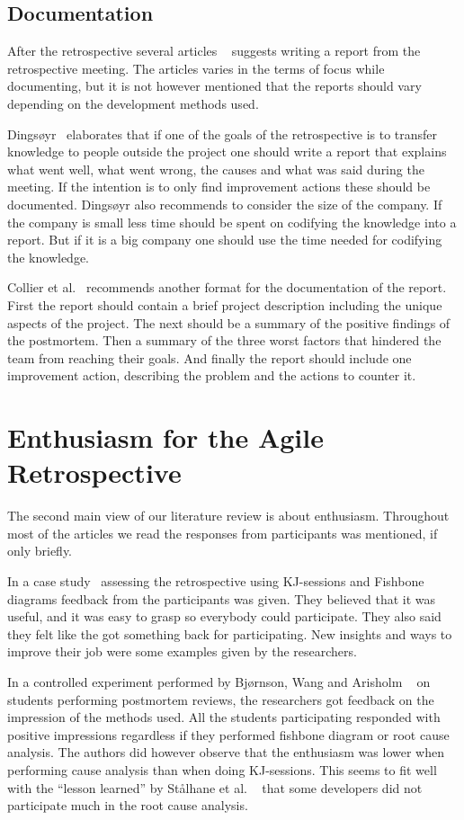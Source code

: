 \documentclass[12pt]{article}
\begin{document}
\subsection{Documentation}
After the retrospective several articles ~\cite{Dingsoyr2005, Moe2001, Hanssen2003, Collier1996} suggests writing a report from the retrospective meeting. The articles varies in the terms of focus while documenting, but it is not however mentioned that the reports should vary depending on the development methods used. 

Dingsøyr~\cite{Dingsoyr2005} elaborates that if one of the goals of the retrospective is to transfer knowledge to people outside the project one should write a report that explains what went well, what went wrong, the causes and what was said during the meeting. If the intention is to only find improvement actions these should be documented. Dingsøyr also recommends to consider the size of the company. If the company is small less time should be spent on codifying the knowledge into a report. But if it is a big company one should use the time needed for codifying the knowledge.

Collier et al.~\cite{Collier1996} recommends another format for the documentation of the report. First the report should contain a brief project description including the unique aspects of the project. The next should be a summary of the positive findings of the postmortem. Then a summary of the three worst factors that hindered the team from reaching their goals. And finally the report should include one improvement action, describing the problem and the actions to counter it. 

\section{Enthusiasm for the Agile Retrospective}
The second main view of our literature review is about enthusiasm. Throughout most of the articles we read the responses from participants was mentioned, if only briefly. 

In a case study~\cite{Hanssen2003} assessing the retrospective using KJ-sessions and Fishbone diagrams feedback from the participants was given. They believed that it was useful, and it was easy to grasp so everybody could participate. They also said they felt like the got something back for participating. New insights and ways to improve their job were some examples given by the researchers. 

In a controlled experiment performed by Bjørnson, Wang and Arisholm ~\cite{Bjornson2009} on students performing postmortem reviews, the researchers got feedback on the impression of the methods used. All the students participating responded with positive impressions regardless if they performed fishbone diagram or root cause analysis. The authors did however observe that the enthusiasm was lower when performing cause analysis than when doing KJ-sessions. This seems to fit well with the ``lesson learned'' by Stålhane et al. ~\cite{Hanssen2003}  that some developers did not participate much in the root cause analysis. 
\end{document}
